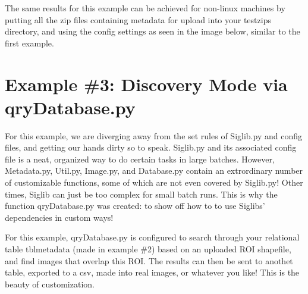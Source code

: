 \documentclass[letterpaper,10pt,openany,oneside]{sphinxmanual}
\begin{document}
The same results for this example can be achieved for non-linux machines by
putting all the zip files containing metadata for upload into your testzips directory,
and using the config settings as seen in the image below, similar to the first example.


\section{Example \#3: Discovery Mode via qryDatabase.py}
\label{tutorial:example-3-discovery-mode-via-qrydatabase-py}
For this example, we are diverging away from the set rules of Siglib.py and
config files, and getting our hands dirty so to speak. Siglib.py and its associated
config file is a neat, organized way to do certain tasks in large batches. However,
Metadata.py, Util.py, Image.py, and Database.py contain an extrordinary number of
customizable functions, some of which are not even covered by Siglib.py! Other times,
Siglib can just be too complex for small batch runs. This is why the function
qryDatabase.py was created: to show off how to to use Siglibs' dependencies in
custom ways!

For this example, qryDatabase.py is configured to search through your relational
table tblmetadata (made in example \#2) based on an uploaded ROI shapefile, and find
images that overlap this ROI. The results can then be sent to anothet table, exported to
a csv, made into real images, or whatever you like! This is the beauty of customization.
\end{document}
